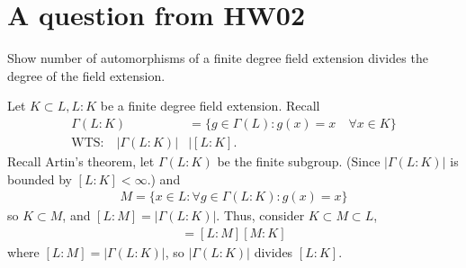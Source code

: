 \documentclass[12pt,english]{article}
\begin{document}
\section*{A question from HW02}
\begin{question}
Show number of automorphisms of a finite degree field extension divides the degree of the field extension. 
\end{question}
Let $K \subset L, L:K$ be a finite degree field extension. Recall
\begin{align*}
    \Gamma(L:K) &= \{g \in \Gamma(L): g(x) = x \quad \forall x \in K\}\\
    \text{WTS:} \quad |\Gamma(L:K)| &\mid [L:K].
\end{align*} Recall Artin's theorem, let $\Gamma(L:K)$ be the finite subgroup. (Since $|\Gamma(L:K)|$ is bounded by $[L:K]<\infty$.) and 
\begin{align*}
    M = \{x \in L: \forall g \in \Gamma(L:K): g(x)= x\}
\end{align*} so $K \subset M$, and $[L:M]=|\Gamma(L:K)|$. Thus, consider $K \subset M \subset L$,
\begin{align*}
    [L:K] = [L:M][M:K]
\end{align*} where $[L:M] = |\Gamma(L:K)|$, so $|\Gamma(L:K)|$ divides $[L:K]$.
\end{document}
